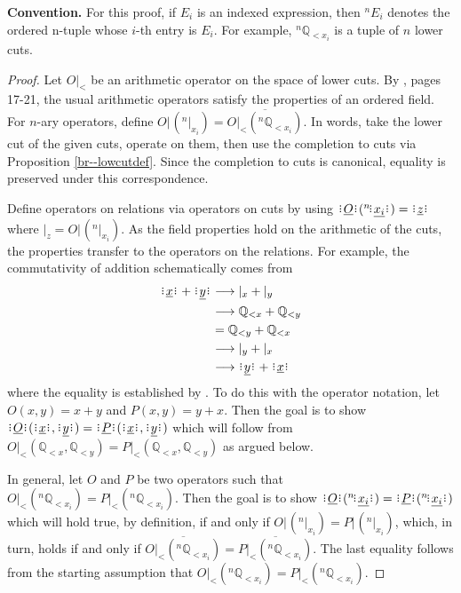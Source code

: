 \documentclass[12pt]{article}
\newcommand{\qcut}[2][x]{\ensuremath{\mathbb{Q}_{#2 #1}}}
\newcommand{\qlt}[1][x]{\qcut[#1]{<}}
\newcommand{\cut}[1][x]{{\vert}_{#1} }
\begin{document}
\begingroup

\providecommand{\tuple}[2][n]{{}^{#1} #2}


 \noindent\textbf{Convention.} For this proof, if $E_i$ is an indexed expression, then $\tuple{E_i}$ denotes the ordered n-tuple whose $i$-th entry is $E_i$. For example, $\tuple{\qlt[x_i]}$ is a tuple of $n$ lower cuts.

\begin{proof}
    Let $O\cut[<]$ be an arithmetic operator on the space of lower cuts. By \cite{rudin}, pages 17-21, the usual arithmetic operators satisfy the properties of an ordered field. For $n$-ary operators, define $O\cut[](
    \tuple{\cut[x_i]} ) = \overline{O\cut[<]( \tuple{\qlt[x_i]} )}$. In words, take the lower cut of the given cuts, operate on them, then use the completion to cuts via Proposition \ref{br--lowcutdef}. Since the completion to cuts is canonical, equality is preserved under this correspondence.

    Define operators on relations via operators on cuts by using $\xrel[O](\tuple{\!\xrel[x_i]}) = \xrel[z]$ where 
    $\cut[z] = O\cut[](\tuple{\cut[x_i]})$.  As the field properties hold on the arithmetic of the cuts, the properties transfer to the operators on the relations. For example, the commutativity of addition schematically comes from  
    \[
    \begin{aligned}
     \xrel + \xrel[y] &\longrightarrow \cut + \cut[y] \\
     &\longrightarrow \qlt + \qlt[y] \\ 
     &= \qlt[y] + \qlt \\
     &\longrightarrow \cut[y] + \cut \\
     &\longrightarrow \xrel[y] + \xrel   
    \end{aligned}
    \]
     where the equality is established by \cite{rudin}. To do this with the operator notation, let $O(x,y) = x + y$ and $P(x,y)= y + x$. Then the goal is to show $\xrel[O](\xrel, \xrel[y]) = \xrel[P](\xrel, \xrel[y])$ which will follow from $O\cut[<](\qlt[x],\qlt[y]) = P\cut[<] (\qlt[x], \qlt[y])$ as argued below. 
        
    In general, let $O$ and $P$ be two operators such that $O\cut[<](\tuple{\qlt[x_i]}) = P\cut[<](\tuple{\qlt[x_i]})$. Then the goal is to show $\xrel[O](\tuple{\!\xrel[x_i]}) = \xrel[P](\tuple{\!\xrel[x_i]})$ which will hold true, by definition, if and only if $O\cut[](\tuple{\cut[x_i]}) =P\cut[](\tuple{\cut[x_i]}) $, which, in turn, holds if and only if $\overline{O\cut[<](\tuple{\qlt[x_i]})} = \overline{P\cut[<](\tuple{\qlt[x_i]})}$. The last equality follows from  the starting assumption that  $O\cut[<](\tuple{\qlt[x_i]}) = P\cut[<](\tuple{\qlt[x_i]})$.


\end{proof}
\end{document}
